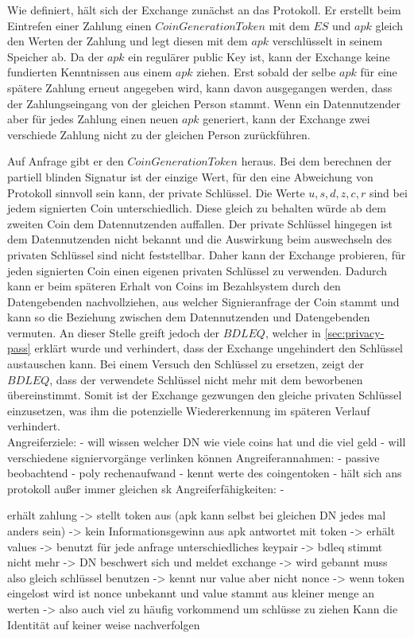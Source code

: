 \documentclass{scrreprt}
\begin{document}
Wie definiert, hält sich der Exchange zunächst an das Protokoll. Er erstellt beim Eintrefen einer Zahlung einen $CoinGenerationToken$ mit dem $ES$ und $apk$ gleich den Werten der Zahlung und legt diesen mit dem $apk$ verschlüsselt in seinem Speicher ab. Da der $apk$ ein regulärer public Key ist, kann der Exchange keine fundierten Kenntnissen aus einem $apk$ ziehen. Erst sobald der selbe $apk$ für eine spätere Zahlung erneut angegeben wird, kann davon ausgegangen werden, dass der Zahlungseingang von der gleichen Person stammt. Wenn ein Datennutzender aber für jedes Zahlung einen neuen $apk$ generiert, kann der Exchange zwei verschiede Zahlung nicht zu der gleichen Person zurückführen.

Auf Anfrage gibt er den $CoinGenerationToken$ heraus. Bei dem berechnen der partiell blinden Signatur ist der einzige Wert, für den eine Abweichung von Protokoll sinnvoll sein kann, der private Schlüssel. Die Werte $u,s,d,z,c,r$ sind bei jedem signierten Coin unterschiedlich. Diese gleich zu behalten würde ab dem zweiten Coin dem Datennutzenden auffallen. Der private Schlüssel hingegen ist dem Datennutzenden nicht bekannt und die Auswirkung beim auswechseln des privaten Schlüssel sind nicht feststellbar. Daher kann der Exchange probieren, für jeden signierten Coin einen eigenen privaten Schlüssel zu verwenden. Dadurch kann er beim späteren Erhalt von Coins im Bezahlsystem durch den Datengebenden nachvollziehen, aus welcher Signieranfrage der Coin stammt und kann so die Beziehung zwischen dem Datennutzenden und Datengebenden vermuten. An dieser Stelle greift jedoch der $BDLEQ$, welcher in \ref{sec:privacy-pass} erklärt wurde und verhindert, dass der Exchange ungehindert den Schlüssel austauschen kann. Bei einem Versuch den Schlüssel zu ersetzen, zeigt der $BDLEQ$, dass der verwendete Schlüssel nicht mehr mit dem beworbenen übereinstimmt. Somit ist der Exchange gezwungen den gleiche privaten Schlüssel einzusetzen, was ihm die potenzielle Wiedererkennung im späteren Verlauf verhindert.\\




Angreiferziele:
    - will wissen welcher DN wie viele coins hat und die viel geld
    - will verschiedene signiervorgänge verlinken können
Angreiferannahmen:
    - passive beobachtend
    - poly rechenaufwand
    - kennt werte des coingentoken
    - hält sich ans protokoll außer immer gleichen sk
Angreiferfähigkeiten:
    -

erhält zahlung -> stellt token aus (apk kann selbst bei gleichen DN jedes mal anders sein) -> kein Informationsgewinn aus apk
antwortet mit token -> erhält values -> benutzt für jede anfrage unterschiedliches keypair -> bdleq stimmt nicht mehr -> DN beschwert sich und meldet exchange -> wird gebannt
muss also gleich schlüssel benutzen -> kennt nur value aber nicht nonce -> wenn token eingelost wird ist nonce unbekannt und value stammt aus kleiner menge an werten -> also auch viel zu häufig vorkommend um schlüsse zu ziehen
Kann die Identität auf keiner weise nachverfolgen
\end{document}
